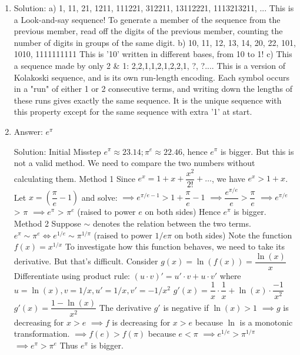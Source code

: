 \begin{enumerate}
\item
Solution: a) 1, 11, 21, 1211, 111221, 312211, 13112221, 1113213211, ...
This is a Look-and-say sequence! To generate a member of the sequence from the previous member, read off the digits of the previous member, counting the number of digits in groups of the same digit.
b) 10, 11, 12, 13, 14, 20, 22, 101, 1010, 1111111111
This is '10' written in different bases, from 10 to 1!
c) This a sequence made by only 2 \& 1: 2,2,1,1,2,1,2,2,1, ?, ?....
This is a version of Kolakoski sequence, and is its own run-length encoding. Each symbol occurs in a "run" of either 1 or 2 consecutive terms, and writing down the lengths of these runs gives exactly the same sequence. It is the unique sequence with this property except for the same sequence with extra '1' at start.




\item
Answer: $e^\pi$
 
Solution: Initial Misstep
$e^\pi \approx 23.14; \pi^e \approx 22.46$, hence $e^\pi$ is bigger.
But this is not a valid method. We need to compare the two numbers without calculating them.
Method 1
Since $e^x = 1 + x + \dfrac{x^2}{2!} + \ldots$, we have $e^x > 1+x$.
Let $x = (\dfrac{\pi}{e} -1)$ and solve:
$\implies e^{\pi/e - 1} > 1 + \dfrac{\pi}{e} - 1$
$\implies \dfrac{e^{\pi/e}}{e} > \dfrac{\pi}{e}$
$\implies e^{\pi/e}$ > $\pi$
$\implies e^\pi$ > $\pi^e$ (raised to power $e$ on both sides)
Hence $e^\pi$ is bigger.
Method 2
Suppose $\sim$ denotes the relation between the two terms.
$e^\pi \sim \pi ^ e \iff e^{1/e} \sim \pi^{1/\pi}$ (raised to power $1/{e\pi}$ on both sides)
Note the function $f(x) = x^{1/x}$
To investigate how this function behaves, we need to take its derivative. But that's difficult.
Consider $g(x) = \ln(f(x)) =  \dfrac{\ln(x)}{x}$
Differentiate using product rule:
$(u \cdot v)' = u' \cdot v + u \cdot v'$
where $u=\ln(x), v = 1/x, u'=1/x, v' = -1/x^2$
$g'(x) = \dfrac{1}{x} \cdot \dfrac{1}{x} + \ln(x) \cdot \dfrac{-1}{x^2}$
$g'(x) = \dfrac{1-\ln{(x)}}{x^2}$
The derivative $g'$ is negative if $\ln(x) > 1$
$\implies g$ is decreasing for $x > e$
$\implies f$ is decreasing for $x > e$ because $\ln$ is a monotonic transformation.
$\implies f(e) > f(\pi)$ because $e<\pi$
$\implies e^{1/e} > \pi^{1/\pi}$
$\implies e^\pi > \pi^e$
Thus $e^\pi$ is bigger.




\end{enumerate}
